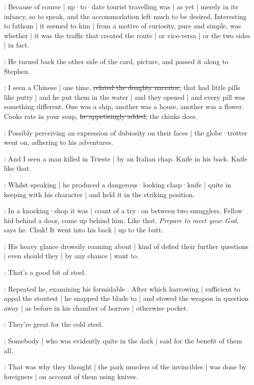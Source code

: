 :
Because of course |
up·to·date tourist travelling was |
as yet |
merely in its infancy,
so to speak,
and the accommodation left much to be desired.
Interesting to fathom |
it seemed to him |
from a motive of curiosity,
pure and simple,
was whether |
it was the traffic that created the route |
or vice-versa |
or the two sides |
in fact.

:
He turned back the other side of the card,
picture,
and passed it along to Stephen.

\Murphy:
I seen a Chinese |
one time,
\sout{related the doughty narrator,}
that had little pills like putty |
and he put them in the water |
and they opened |
and every pill was something different.
One was a ship,
another was a house,
another was a flower.
Cooks rats in your soup,
\sout{he appetisingly added,}
the chinks does.

:
Possibly perceiving an expression of dubiosity on their faces |
the globe·trotter went on,
adhering to his adventures.

\Murphy:
And I seen a man killed in Trieste |
by an Italian chap.
Knife in his back.
Knife like that.

:
Whilst speaking |
he produced a dangerous·looking clasp·knife |
quite in keeping with his character |
and held it in the striking position.

\Murphy:
In a knocking·shop it was |
count of a try·on between two smugglers.
Fellow hid behind a door,
come up behind him.
Like that.
\emph{Prepare to meet your God},
says he.
Chuk!
It went into his back |
up to the butt.

:
His heavy glance drowsily roaming about |
kind of defied their further questions |
even should they |
by any chance |
want to.

\Murphy:
That's a good bit of steel.

:
Repeated he,
examining his formidable .
After which harrowing  |
sufficient to appal the stoutest |
he snapped the blade to |
and stowed the weapon in question away |
as before in his chamber of horrors |
otherwise pocket.

\Someone:
They're great for the cold steel.

:
Somebody |
who was evidently quite in the dark |
said for the benefit of them all.%

\Someone:
That was why they thought |
the park murders of the invincibles |
was done by foreigners |
on account of them using knives.

